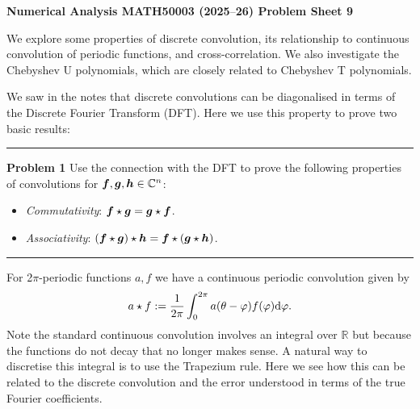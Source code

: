 \documentclass[12pt,a4paper]{article}
\def\endash{–}
\def\bbR{ {\mathbb R} }
\def\bbC{ {\mathbb C} }
\def\f{ {\vc f} }
\def\g{ {\vc g} }
\def\h{ {\vc h} }
\begin{document}
\textbf{Numerical Analysis MATH50003 (2025\ensuremath{\endash}26) Problem Sheet 9}

We explore some properties of discrete convolution, its relationship to continuous convolution of periodic functions, and cross-correlation. We also investigate the Chebyshev U polynomials, which are closely related to Chebyshev T polynomials.

We saw in the notes that discrete convolutions can be diagonalised in terms of the Discrete Fourier Transform (DFT). Here we use this property to prove two basic results:

\rule{\textwidth}{1pt}
\textbf{Problem 1} Use the connection with the DFT to prove the following properties of convolutions for $\ensuremath{\bm{\f}},\ensuremath{\bm{\g}},\ensuremath{\bm{\h}} \ensuremath{\in} \ensuremath{\bbC}^n$:

\begin{itemize}
\item[1. ] \emph{Commutativity}: $\ensuremath{\bm{\f}} \ensuremath{\star} \ensuremath{\bm{\g}} = \ensuremath{\bm{\g}} \ensuremath{\star} \ensuremath{\bm{\f}}$.


\item[2. ] \emph{Associativity}: $(\ensuremath{\bm{\f}} \ensuremath{\star} \ensuremath{\bm{\g}}) \ensuremath{\star} \ensuremath{\bm{\h}} = \ensuremath{\bm{\f}} \ensuremath{\star} (\ensuremath{\bm{\g}} \ensuremath{\star} \ensuremath{\bm{\h}})$.

\end{itemize}
\rule{\textwidth}{1pt}
For 2\ensuremath{\pi}-periodic functions $a,f$ we have a continuous periodic convolution given by
\[
a \star f := {1 \over 2\pi} \int_0^{2\pi}  a(\theta-\varphi) f(\varphi) {\rm d} \varphi.
\]
Note the standard continuous convolution involves an integral over $\ensuremath{\bbR}$ but because the functions do not decay that no longer makes sense. A natural way to discretise this integral is to use the Trapezium rule. Here we see how this can be related to the discrete convolution and the error understood in terms of the true Fourier coefficients.
\end{document}
